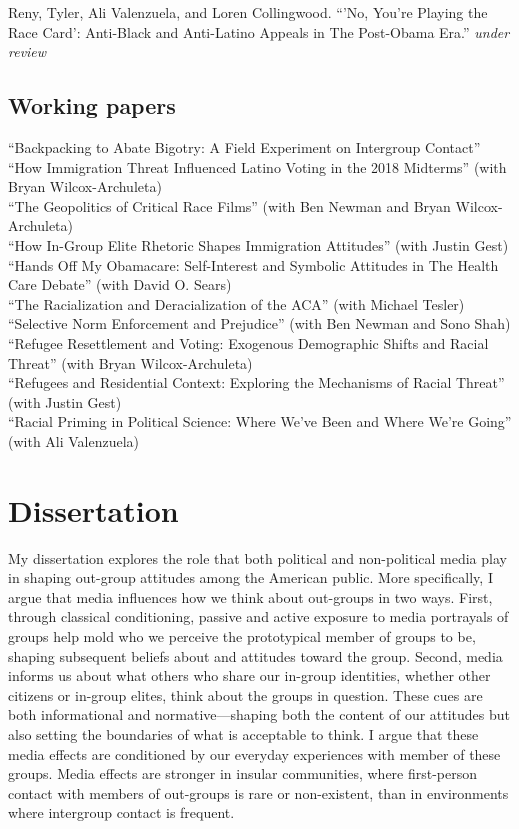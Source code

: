 \documentclass[11pt, a4paper]{article}
\newcommand{\years}[1]{\marginnote{\scriptsize #1}}
\begin{document}
\years{} Reny, Tyler, Ali Valenzuela, and Loren Collingwood. ``'No, You’re Playing the Race Card': Anti-Black and Anti-Latino Appeals in The Post-Obama Era.'' \textit{under review}\\

\subsection*{Working papers}

\years{}``Backpacking to Abate Bigotry: A Field Experiment on Intergroup Contact''\\
\years{}``How Immigration Threat Influenced Latino Voting in the 2018 Midterms'' (with Bryan Wilcox-Archuleta)\\
\years{}``The Geopolitics of Critical Race Films'' (with Ben Newman and Bryan Wilcox-Archuleta)\\
\years{}``How In-Group Elite Rhetoric Shapes Immigration Attitudes'' (with Justin Gest)\\
\years{}``Hands Off My Obamacare: Self-Interest and Symbolic Attitudes in The Health Care Debate'' (with David O. Sears)\\
\years{}``The Racialization and Deracialization of the ACA'' (with Michael Tesler)\\
\years{}``Selective Norm Enforcement and Prejudice'' (with Ben Newman and Sono Shah)\\
\years{}``Refugee Resettlement and Voting: Exogenous Demographic Shifts and Racial Threat'' (with Bryan Wilcox-Archuleta)\\
\years{}``Refugees and Residential Context: Exploring the Mechanisms of Racial Threat'' (with Justin Gest)\\
\years{}``Racial Priming in Political Science: Where We've Been and Where We're Going'' (with Ali Valenzuela)\\

\section*{Dissertation}

My dissertation explores the role that both political and non-political media play in shaping out-group attitudes among the American public. More specifically, I argue that media influences how we think about out-groups in two ways. First, through classical conditioning, passive and active exposure to media portrayals of groups help mold who we perceive the prototypical member of groups to be, shaping subsequent beliefs about and attitudes toward the group. Second, media informs us about what others who share our in-group identities, whether other citizens or in-group elites, think about the groups in question. These cues are both informational and normative---shaping both the content of our attitudes but also setting the boundaries of what is acceptable to think. I argue that these media effects are conditioned by our everyday experiences with member of these groups. Media effects are stronger in insular communities, where first-person contact with members of out-groups is rare or non-existent, than in environments where intergroup contact is frequent.
\end{document}
